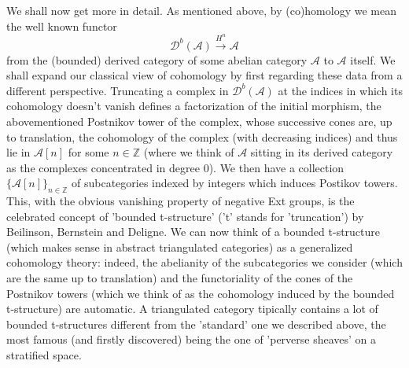 We shall now get more in detail. As mentioned above, by (co)homology we mean the well known functor $$\mathscr{D}^b(\mathscr{A}) \overset{H^n}{\longrightarrow} \mathscr{A}$$ from the (bounded) derived category of some abelian category $\mathscr{A}$ to $\mathscr{A}$ itself. We shall expand our classical view of cohomology by first regarding these data from a different perspective. Truncating a complex in $\mathscr{D}^b(\mathscr{A})$ at the indices in which its cohomology doesn't vanish defines a factorization of the initial morphism, the abovementioned Postnikov tower of the complex, whose successive cones are, up to translation, the cohomology of the complex (with decreasing indices) and thus lie in $\mathscr{A}[n]$ for some $n \in \mathbb{Z}$ (where we think of $\mathscr{A}$ sitting in its derived category as the complexes concentrated in degree $0$). We then have a collection $\{ \mathscr{A}[n] \}_{n \in \mathbb{Z}}$ of subcategories indexed by integers which induces Postikov towers. This, with the obvious vanishing property of negative Ext groups, is the celebrated concept of 'bounded t-structure' ('t' stands for 'truncation') by Beilinson, Bernstein and Deligne. We can now think of a bounded t-structure (which makes sense in abstract triangulated categories) as a generalized cohomology theory: indeed, the abelianity of the subcategories we consider (which are the same up to translation) and the functoriality of the cones of the Postnikov towers (which we think of as the cohomology induced by the bounded t-structure) are automatic. A triangulated category tipically contains a lot of bounded t-structures different from the 'standard' one we described above, the most famous (and firstly discovered) being the one of 'perverse sheaves' on a stratified space. \\


